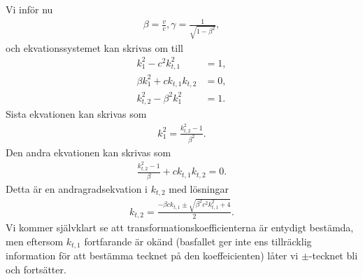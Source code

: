 Vi inför nu
\begin{align*}
	\beta = \frac{v}{c}, \gamma = \frac{1}{\sqrt{1 - \beta^{2}}},
\end{align*}
och ekvationssystemet kan skrivas om till
\begin{align*}
	k_{1}^{2} - c^{2}k_{t, 1}^{2}       &= 1, \\
	\beta k_{1}^{2} + ck_{t, 1}k_{t, 2} &= 0, \\
	k_{t, 2}^{2} - \beta^{2}k_{1}^{2}   &= 1.
\end{align*}
Sista ekvationen kan skrivas som
\begin{align*}
	k_{1}^{2} = \frac{k_{t, 2}^{2} - 1}{\beta^{2}}.
\end{align*}
Den andra ekvationen kan skrivas som
\begin{align*}
	\frac{k_{t, 2}^{2} - 1}{\beta} + ck_{t, 1}k_{t, 2} = 0.
\end{align*}
Detta är en andragradsekvation i $k_{t, 2}$ med lösningar
\begin{align*}
	k_{t, 2} = \frac{-\beta ck_{t, 1} \pm\sqrt{\beta^{2}c^{2}k_{t, 1}^{2} + 4}}{2}.
\end{align*}
Vi kommer självklart se att transformationskoefficienterna är entydigt bestämda, men eftersom $k_{t, 1}$ fortfarande är okänd (basfallet ger inte ens tillräcklig information för att bestämma tecknet på den koeffeicienten) låter vi $\pm$-tecknet bli och fortsätter.

